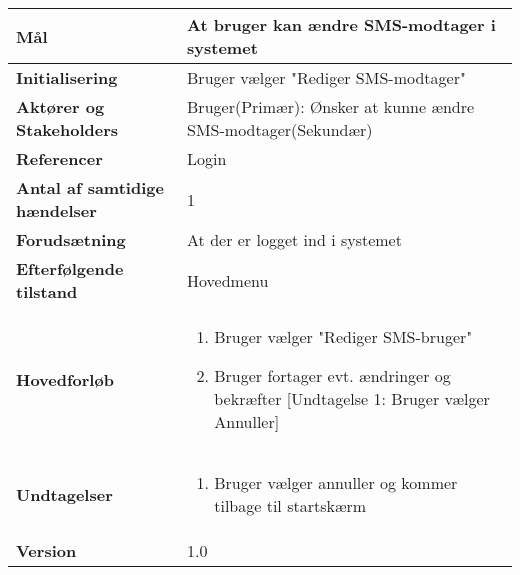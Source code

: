\begin{table}[H] \centering
\begin{tabular}{|p{6cm}|p{8cm}|}
	\hline
\textbf{Mål} &
At bruger kan ændre SMS-modtager i systemet\\\hline

\textbf{Initialisering} &
  Bruger vælger "Rediger SMS-modtager"\\\hline
 
\textbf{Aktører og Stakeholders} &
Bruger(Primær): Ønsker at kunne ændre SMS-modtager(Sekundær)  \\\hline

\textbf{Referencer} &
Login  \\\hline

\textbf{Antal af samtidige hændelser} &
1  \\\hline

\textbf{Forudsætning} &
At der er logget ind i systemet  \\\hline

\textbf{Efterfølgende tilstand} &
Hovedmenu  \\\hline

\textbf{Hovedforløb} &
\begin{enumerate}

\item Bruger vælger "Rediger SMS-bruger"
\item Bruger fortager evt. ændringer og bekræfter [Undtagelse 1: Bruger vælger Annuller]

\end{enumerate}   
 \\\hline
 
\textbf{Undtagelser}
&\begin{enumerate}[label= \ref{UC8und1}a.]
\item Bruger vælger annuller og kommer tilbage til startskærm
\end{enumerate}
 \\\hline
 
		\textbf{Version}		&1.0 \\\hline
	\end{tabular}
	\label{UC6} 
\end{table}
